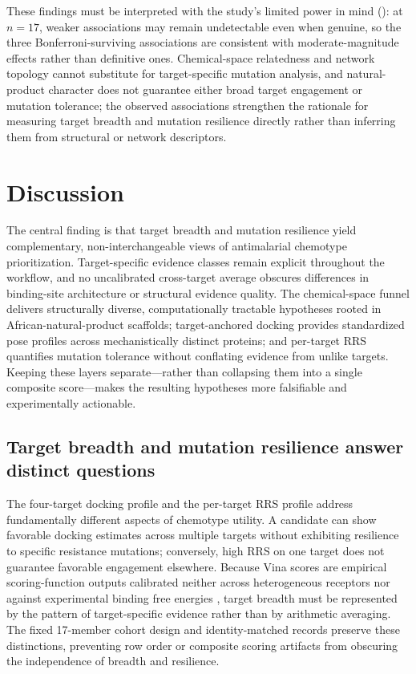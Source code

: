 \documentclass[journal=jcisd8,manuscript=article]{achemso}
\begin{document}
These findings must be interpreted with the study's limited power in mind (): at $n=\num{17}$, weaker associations may remain undetectable even when genuine, so the three Bonferroni-surviving associations are consistent with moderate-magnitude effects rather than definitive ones. Chemical-space relatedness and network topology cannot substitute for target-specific mutation analysis, and natural-product character does not guarantee either broad target engagement or mutation tolerance; the observed associations strengthen the rationale for measuring target breadth and mutation resilience directly rather than inferring them from structural or network descriptors.

\section{Discussion}\label{sec:discussion}
The central finding is that target breadth and mutation resilience yield complementary, non-interchangeable views of antimalarial chemotype prioritization. Target-specific evidence classes remain explicit throughout the workflow, and no uncalibrated cross-target average obscures differences in binding-site architecture or structural evidence quality. The chemical-space funnel delivers structurally diverse, computationally tractable hypotheses rooted in African-natural-product scaffolds; target-anchored docking provides standardized pose profiles across mechanistically distinct proteins; and per-target RRS quantifies mutation tolerance without conflating evidence from unlike targets. Keeping these layers separate—rather than collapsing them into a single composite score—makes the resulting hypotheses more falsifiable and experimentally actionable.

\subsection{Target breadth and mutation resilience answer distinct questions}\label{sec:disc_breadth}
The four-target docking profile and the per-target RRS profile address fundamentally different aspects of chemotype utility. A candidate can show favorable docking estimates across multiple targets without exhibiting resilience to specific resistance mutations; conversely, high RRS on one target does not guarantee favorable engagement elsewhere. Because Vina scores are empirical scoring-function outputs calibrated neither across heterogeneous receptors nor against experimental binding free energies \cite{Quiroga2016}, target breadth must be represented by the pattern of target-specific evidence rather than by arithmetic averaging. The fixed 17-member cohort design and identity-matched records preserve these distinctions, preventing row order or composite scoring artifacts from obscuring the independence of breadth and resilience.
\end{document}
